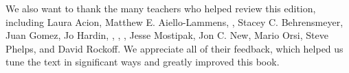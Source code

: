 \noindent%
We also want to thank the many teachers who helped review
this edition, including
Laura Acion,
    {Matthew E. Aiello-Lammens},
,
Stacey C. Behrensmeyer,
Juan Gomez,
Jo Hardin,
,
,
,
Jesse Mostipak,
Jon C. New,
Mario Orsi,
Steve Phelps,
and David Rockoff.
We appreciate all of their feedback, which helped
us tune the text in significant ways and greatly
improved this book.
